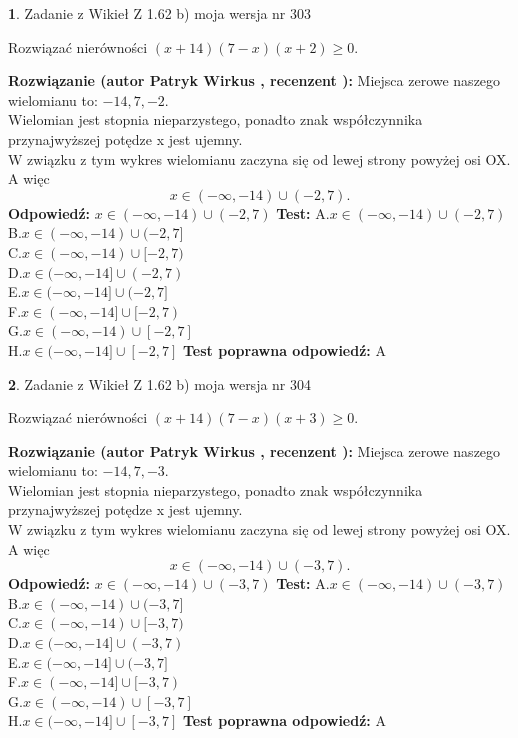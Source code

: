 \documentclass[12pt, a4paper]{article}
\theoremstyle{definition} %
\newtheorem{zad}{}
\newcommand{\zadStart}[1]{\begin{zad}#1\newline}
\newcommand{\zadStop}{\end{zad}}
\newcommand{\rozwStart}[2]{\noindent \textbf{Rozwiązanie (autor #1 , recenzent #2): }\newline}
\newcommand{\rozwStop}{\newline}
\newcommand{\odpStart}{\noindent \textbf{Odpowiedź:}\newline}
\newcommand{\odpStop}{\newline}
\newcommand{\testStart}{\noindent \textbf{Test:}\newline}
\newcommand{\testStop}{\newline}
\newcommand{\kluczStart}{\noindent \textbf{Test poprawna odpowiedź:}\newline}
\newcommand{\kluczStop}{\newline}
\begin{document}
\zadStart{Zadanie z Wikieł Z 1.62 b) moja wersja nr 303}

Rozwiązać nierówności $(x+14)(7-x)(x+2)\ge0$.
\zadStop
\rozwStart{Patryk Wirkus}{}
Miejsca zerowe naszego wielomianu to: $-14, 7, -2$.\\
Wielomian jest stopnia nieparzystego, ponadto znak współczynnika przy\linebreak najwyższej potędze x jest ujemny.\\ W związku z tym wykres wielomianu zaczyna się od lewej strony powyżej osi OX. A więc $$x \in (-\infty,-14) \cup (-2,7).$$
\rozwStop
\odpStart
$x \in (-\infty,-14) \cup (-2,7)$
\odpStop
\testStart
A.$x \in (-\infty,-14) \cup (-2,7)$\\
B.$x \in (-\infty,-14) \cup (-2,7]$\\
C.$x \in (-\infty,-14) \cup [-2,7)$\\
D.$x \in (-\infty,-14] \cup (-2,7)$\\
E.$x \in (-\infty,-14] \cup (-2,7]$\\
F.$x \in (-\infty,-14] \cup [-2,7)$\\
G.$x \in (-\infty,-14) \cup [-2,7]$\\
H.$x \in (-\infty,-14] \cup [-2,7]$
\testStop
\kluczStart
A
\kluczStop



\zadStart{Zadanie z Wikieł Z 1.62 b) moja wersja nr 304}

Rozwiązać nierówności $(x+14)(7-x)(x+3)\ge0$.
\zadStop
\rozwStart{Patryk Wirkus}{}
Miejsca zerowe naszego wielomianu to: $-14, 7, -3$.\\
Wielomian jest stopnia nieparzystego, ponadto znak współczynnika przy\linebreak najwyższej potędze x jest ujemny.\\ W związku z tym wykres wielomianu zaczyna się od lewej strony powyżej osi OX. A więc $$x \in (-\infty,-14) \cup (-3,7).$$
\rozwStop
\odpStart
$x \in (-\infty,-14) \cup (-3,7)$
\odpStop
\testStart
A.$x \in (-\infty,-14) \cup (-3,7)$\\
B.$x \in (-\infty,-14) \cup (-3,7]$\\
C.$x \in (-\infty,-14) \cup [-3,7)$\\
D.$x \in (-\infty,-14] \cup (-3,7)$\\
E.$x \in (-\infty,-14] \cup (-3,7]$\\
F.$x \in (-\infty,-14] \cup [-3,7)$\\
G.$x \in (-\infty,-14) \cup [-3,7]$\\
H.$x \in (-\infty,-14] \cup [-3,7]$
\testStop
\kluczStart
A
\kluczStop
\end{document}

